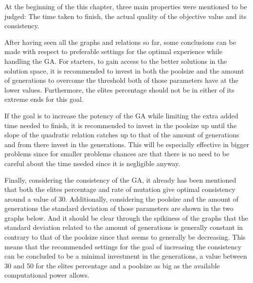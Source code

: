\par
At the beginning of the this chapter, three main properties were mentioned to be judged: The time taken to finish, the actual quality of the objective value and its consistency.
\par
After having seen all the graphs and relations so far, some conclusions can be made with respect to preferable settings for the optimal experience while handling the GA.
For starters, to gain access to the better solutions in the solution space, it is recommended to invest in both the poolsize and the amount of generations to overcome the threshold both of those parameters have at the lower values. Furthermore, the elites percentage should not be in either of its extreme ends for this goal.
\par
\vspace{5mm}
If the goal is to increase the potency of the GA while limiting the extra added time needed to finish, it is recommended to invest in the poolsize up until the slope of the quadratic relation catches up to that of the amount of generations and from there invest in the generations. This will be especially effective in bigger problems since for smaller problems chances are that there is no need to be careful about the time needed since it is negligible anyway.
\par
\vspace{5mm}
Finally, considering the consistency of the GA, it already has been mentioned that both the elites percentage and rate of mutation give optimal consistency around a value of 30. Additionally, considering the poolsize and the amount of generations the standard deviation of those parameters are shown in the two graphs below. And it should be clear through the spikiness of the graphs that the standard deviation related to the amount of generations is generally constant in contrary to that of the poolsize since that seems to generally be decreasing. This means that the recommended settings for the goal of increasing the consistency can be concluded to be a minimal investment in the generations, a value between 30 and 50 for the elites percentage and a poolsize as big as the available computational power allows.

